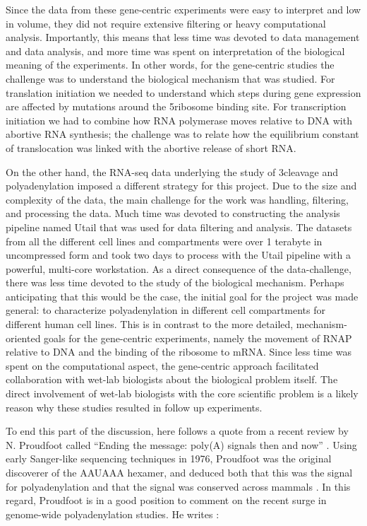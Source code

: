 Since the data from these gene-centric experiments were easy to interpret and
low in volume, they did not require extensive filtering or heavy computational
analysis. Importantly, this means that less time was devoted to data management
and data analysis, and more time was spent on interpretation of the biological
meaning of the experiments. In other words, for the gene-centric studies the
challenge was to understand the biological mechanism that was studied. For
translation initiation we needed to understand which steps during gene
expression are affected by mutations around the 5\ppp ribosome binding site.
For transcription initiation we had to combine how RNA polymerase moves
relative to DNA with abortive RNA synthesis; the challenge was to relate how
the equilibrium constant of translocation was linked with the abortive release
of short RNA.

On the other hand, the RNA-seq data underlying the study of 3\ppp cleavage and
polyadenylation imposed a different strategy for this project. Due to the size
and complexity of the data, the main challenge for the work was handling,
filtering, and processing the data. Much time was devoted to constructing the
analysis pipeline named Utail that was used for data filtering and analysis.
The datasets from all the different cell lines and compartments were over 1
terabyte in uncompressed form and took two days to process with the Utail
pipeline with a powerful, multi-core workstation. As a direct consequence of
the data-challenge, there was less time devoted to the study of the biological
mechanism. Perhaps anticipating that this would be the case, the initial goal
for the project was made general: to characterize polyadenylation in different
cell compartments for different human cell lines. This is in contrast to the
more detailed, mechanism-oriented goals for the gene-centric experiments,
namely the movement of RNAP relative to DNA and the binding of the ribosome to
mRNA.  Since less time was spent on the computational aspect, the gene-centric
approach facilitated collaboration with wet-lab biologists about the biological
problem itself. The direct involvement of wet-lab biologists with the core
scientific problem is a likely reason why these studies resulted in follow up
experiments.

To end this part of the discussion, here follows a quote from a recent review
by N. Proudfoot called ``Ending the message: poly(A) signals then and now''
\cite{proudfoot_ending_2011}. Using early Sanger-like sequencing techniques in
1976, Proudfoot was the original discoverer of the AAUAAA hexamer, and deduced
both that this was the signal for polyadenylation and that the signal was
conserved across mammals \cite{proudfoot_3_1976}. In this regard, Proudfoot is
in a good position to comment on the recent surge in genome-wide
polyadenylation studies. He writes \cite{proudfoot_ending_2011}:

